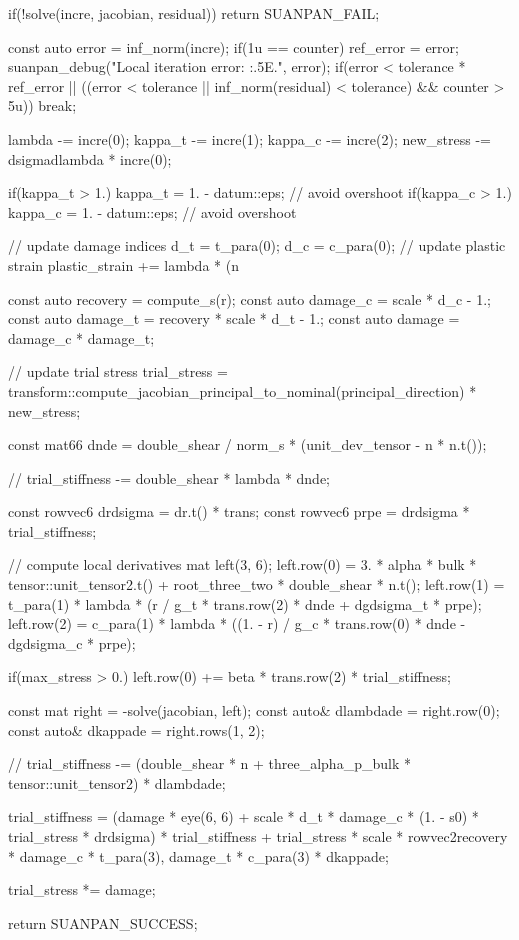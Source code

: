\begin{cppcode}
{{        if(!solve(incre, jacobian, residual)) return SUANPAN_FAIL;

        const auto error = inf_norm(incre);
        if(1u == counter) ref_error = error;
        suanpan_debug("Local iteration error: {:.5E}.\n", error);
        if(error < tolerance * ref_error || ((error < tolerance || inf_norm(residual) < tolerance) && counter > 5u)) break;

        lambda -= incre(0);
        kappa_t -= incre(1);
        kappa_c -= incre(2);
        new_stress -= dsigmadlambda * incre(0);

        if(kappa_t > 1.) kappa_t = 1. - datum::eps; // avoid overshoot
        if(kappa_c > 1.) kappa_c = 1. - datum::eps; // avoid overshoot
    }

    // update damage indices
    d_t = t_para(0);
    d_c = c_para(0);
    // update plastic strain
    plastic_strain += lambda * (n %

    const auto recovery = compute_s(r);
    const auto damage_c = scale * d_c - 1.;
    const auto damage_t = recovery * scale * d_t - 1.;
    const auto damage = damage_c * damage_t;

    // update trial stress
    trial_stress = transform::compute_jacobian_principal_to_nominal(principal_direction) * new_stress;

    const mat66 dnde = double_shear / norm_s * (unit_dev_tensor - n * n.t());

    // 
    trial_stiffness -= double_shear * lambda * dnde;

    const rowvec6 drdsigma = dr.t() * trans;
    const rowvec6 prpe = drdsigma * trial_stiffness;

    // compute local derivatives
    mat left(3, 6);
    left.row(0) = 3. * alpha * bulk * tensor::unit_tensor2.t() + root_three_two * double_shear * n.t();
    left.row(1) = t_para(1) * lambda * (r / g_t * trans.row(2) * dnde + dgdsigma_t * prpe);
    left.row(2) = c_para(1) * lambda * ((1. - r) / g_c * trans.row(0) * dnde - dgdsigma_c * prpe);

    if(max_stress > 0.) left.row(0) += beta * trans.row(2) * trial_stiffness;

    const mat right = -solve(jacobian, left);
    const auto& dlambdade = right.row(0);
    const auto& dkappade = right.rows(1, 2);

    // 
    trial_stiffness -= (double_shear * n + three_alpha_p_bulk * tensor::unit_tensor2) * dlambdade;

    trial_stiffness = (damage * eye(6, 6) + scale * d_t * damage_c * (1. - s0) * trial_stress * drdsigma) * trial_stiffness + trial_stress * scale * rowvec2{recovery * damage_c * t_para(3), damage_t * c_para(3)} * dkappade;

    trial_stress *= damage;

    return SUANPAN_SUCCESS;
}
\end{cppcode}
